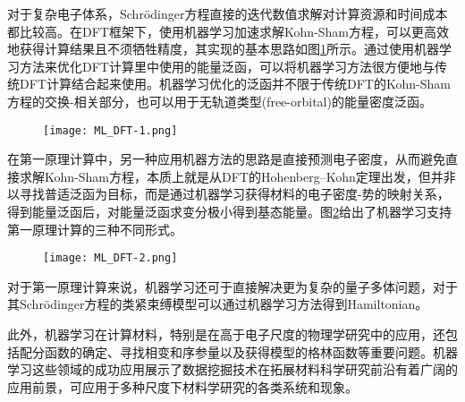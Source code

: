 对于复杂电子体系，\textrm{Schr\"odinger}方程直接的迭代数值求解对计算资源和时间成本都比较高。在\textrm{DFT}框架下，使用机器学习加速求解\textrm{Kohn-Sham}方程，可以更高效地获得计算结果且不须牺牲精度，其实现的基本思路如图\ref{ML_QM}所示。通过使用机器学习方法来优化\textrm{DFT}计算里中使用的能量泛函，可以将机器学习方法很方便地与传统\textrm{DFT}计算结合起来使用\cite{PRB94-245129_2016,PRL108-253002_2012,JCP139-224104_2013,IJQC116-819_2016,JCP148-241705_2018}。机器学习优化的泛函并不限于传统\textrm{DFT}的\textrm{Kohn-Sham}方程的交换-相关部分，也可以用于无轨道类型\textrm{(free-orbital)}的能量密度泛函。
\begin{figure}[h!]
\centering
\vspace*{-0.1in}
\texttt{[image: ML\_DFT-1.png]}
\caption{\fontsize{7.2pt}{4.2pt}}%
\label{ML_QM}
\end{figure}

在第一原理计算中，另一种应用机器方法的思路是直接预测电子密度\cite{NC8-872_2017,CMS149-250_2018,arXiv1811006255_2018}，从而避免直接求解\textrm{Kohn-Sham}方程，本质上就是从\textrm{DFT}的\textrm{Hohenberg–Kohn}定理出发，但并非以寻找普适泛函为目标，而是通过机器学习获得材料的电子密度-势的映射关系，得到能量泛函后，对能量泛函求变分极小得到基态能量。图\ref{ML_DFT}给出了机器学习支持第一原理计算的三种不同形式。
\begin{figure}[h!]
\centering
\vspace*{-0.1in}
\texttt{[image: ML\_DFT-2.png]}
\caption{\fontsize{7.2pt}{4.2pt}}%
\label{ML_DFT}
\end{figure}

对于第一原理计算来说，机器学习还可于直接解决更为复杂的量子多体问题\cite{CPC104-1_1997,Science355-602_2017,PRE98-033305_2018}，对于其\textrm{Schr\"odinger}方程\cite{PRA96-042113_2017}的类紧束缚模型可以通过机器学习方法得到\textrm{Hamiltonian}\cite{SR7-42669_2017}。

此外，机器学习在计算材料，特别是在高于电子尺度的物理学研究中的应用，还包括配分函数的确定\cite{JCP149-044118_2018}、寻找相变和序参量\cite{PRB94-195105_2016,NP13-431_2017,PRB96-205146_2017,SR7-8823_2017,PRB97-115453_2018}以及获得模型的格林函数\cite{PRB90-155136_2014}等重要问题。机器学习这些领域的成功应用展示了数据挖掘技术在拓展材料科学研究前沿有着广阔的应用前景，可应用于多种尺度下材料学研究的各类系统和现象。


